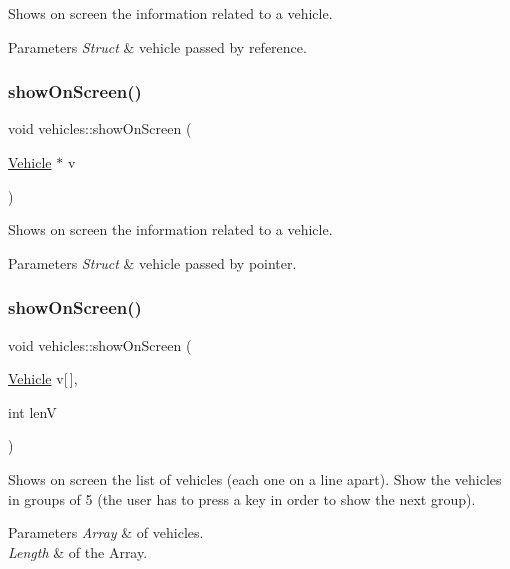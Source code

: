 Shows on screen the information related to a vehicle. 


\begin{DoxyParams}{Parameters}
{\em Struct} & vehicle passed by reference. \\
\hline
\end{DoxyParams}
\mbox{\label{namespacevehicles_a687a5a510662dc4c11628842c7ec4fb8}} 
\subsubsection{\texorpdfstring{show\+On\+Screen()}{showOnScreen()}\hspace{0.1cm}{\footnotesize\ttfamily [2/3]}}
{\footnotesize\ttfamily void vehicles\+::show\+On\+Screen (\begin{DoxyParamCaption}\item[{\hyperlink{structvehicles_1_1_vehicle}{Vehicle} $\ast$}]{v }\end{DoxyParamCaption})}



Shows on screen the information related to a vehicle. 


\begin{DoxyParams}{Parameters}
{\em Struct} & vehicle passed by pointer. \\
\hline
\end{DoxyParams}
\mbox{\label{namespacevehicles_a9b3d0d3ac3b8395396f3ea0bcf5a00c1}} 
\subsubsection{\texorpdfstring{show\+On\+Screen()}{showOnScreen()}\hspace{0.1cm}{\footnotesize\ttfamily [3/3]}}
{\footnotesize\ttfamily void vehicles\+::show\+On\+Screen (\begin{DoxyParamCaption}\item[{\hyperlink{structvehicles_1_1_vehicle}{Vehicle}}]{v\mbox{[}$\,$\mbox{]},  }\item[{int}]{lenV }\end{DoxyParamCaption})}



Shows on screen the list of vehicles (each one on a line apart). Show the vehicles in groups of 5 (the user has to press a key in order to show the next group). 


\begin{DoxyParams}{Parameters}
{\em Array} & of vehicles. \\
\hline
{\em Length} & of the Array. \\
\hline
\end{DoxyParams}
